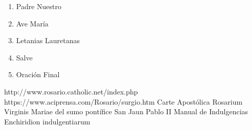 \documentclass[12pt, letterpaper]{report}
\begin{document}
    \begin{enumerate}
        \item Padre Nuestro
        \item Ave Mar\'ia
        \item Letanias Lauretanas
        \item Salve
        \item Oraci\'on Final
    \end{enumerate}
    \clearpage
    
    
    
    
    
    
    
    
    
    \begin{thebibliography}{0}
       http://www.rosario.catholic.net/index.php
       https://www.aciprensa.com/Rosario/surgio.htm
       Carte Apostólica Rosarium Virginis Mariae del sumo pontífice San Jaun Pablo II
       Manual de Indulgencias Enchiridion indulgentiarum
    \end{thebibliography}
\end{document}
